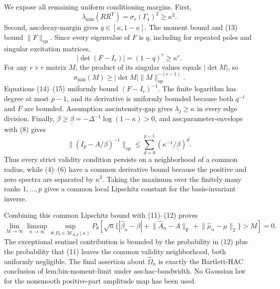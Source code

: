 We expose all remaining uniform conditioning margins.  First,
\[
 \lambda_{\min}(RR^{\mathsf T})=\sigma_r(\Gamma_1)^2\geq\kappa^2.
\tag{13}
\]
Second, \(\text{ass:decay-margin}\) gives \(q\in[\kappa,1-\kappa]\).  The moment bound and (13) bound \(\lVert F\rVert_{\mathrm{op}}\).  Since every eigenvalue of \(F\) is \(q\), including for repeated poles and singular excitation matrices,
\[
 |\det(F-I_r)|=(1-q)^r\geq\kappa^r.
\tag{14}
\]
For any \(r\times r\) matrix \(M\), the product of its singular values equals \(|\det M|\), so
\[
 \sigma_{\min}(M)\geq |\det M|\lVert M\rVert_{\mathrm{op}}^{-(r-1)}.
\tag{15}
\]
Equations (14)--(15) uniformly bound \((F-I_r)^{-1}\).  The finite logarithm has degree at most \(p-1\), and its derivative is uniformly bounded because both \(q^{-1}\) and \(F\) are bounded.  Assumption \(\text{ass:intensity-gap}\) gives \(\lambda_j\geq\kappa\) in every edge division.  Finally, \(\beta\geq\underline\beta=-\Delta^{-1}\log(1-\kappa)>0\), and \(\text{ass:parameter-envelope}\) with (8) gives
\[
 \lVert(I_p-A/\beta)^{-1}\rVert_{\mathrm{op}}
 \leq\sum_{d=0}^{p-1}(\kappa^{-1}/\underline\beta)^d.
\tag{16}
\]
Thus every strict validity condition persists on a neighborhood of a common radius, while (4)--(6) have a common derivative bound because the positive and zero spectra are separated by \(\kappa^2\).  Taking the maximum over the finitely many ranks \(1,\ldots,p\) gives a common local Lipschitz constant for the basis-invariant inverse.

Combining this common Lipschitz bound with (11)--(12) proves
\[
 \lim_{M\to\infty}\limsup_{n\to\infty}
 \sup_{\theta:P_\theta\in\mathcal M_{\Delta,p}(\kappa)}
 P_\theta\!\left[
 \sqrt n\{ |\widehat\beta_n-\beta|+
 \lVert\widehat A_n-A\rVert_{\mathrm F}+
 \lVert\widehat\mu_n-\mu\rVert_2\}>M\right]=0.
\tag{17}
\]
The exceptional sentinel contribution is bounded by the probability in (12) plus the probability that (11) leaves the common validity neighborhood, both uniformly negligible.  The final assertion about \(\widehat\Omega_n\) is exactly the Bartlett-HAC conclusion of \(\text{lem:bin-moment-limit}\) under \(\text{ass:hac-bandwidth}\).  No Gaussian law for the nonsmooth positive-part amplitude map has been used.